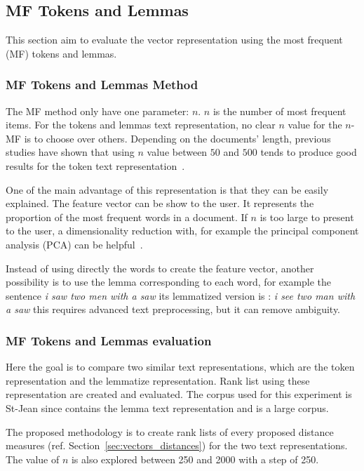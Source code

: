 \subsection{MF Tokens and Lemmas \label{sec:tokens_lemmas}}

This section aim to evaluate the vector representation using the most frequent (MF) tokens and lemmas.

\subsubsection{MF Tokens and Lemmas Method}

The MF method only have one parameter: $n$.
$n$ is the number of most frequent items.
For the tokens and lemmas text representation, no clear $n$ value for the $n$-MF is to choose over others.
Depending on the documents' length, previous studies have shown that using $n$ value between $50$ and $500$ tends to produce good results for the token text representation~\cite{savoy_text_representation}.

One of the main advantage of this representation is that they can be easily explained.
The feature vector can be show to the user.
It represents the proportion of the most frequent words in a document.
If $n$ is too large to present to the user, a dimensionality reduction with, for example the principal component analysis (PCA) can be helpful~\cite{savoy_stylo}.

Instead of using directly the words to create the feature vector, another possibility is to use the lemma corresponding to each word, for example the sentence \textit{i saw two men with a saw} its lemmatized version is : \textit{i see two man with a saw} this requires advanced text preprocessing, but it can remove ambiguity.

\subsubsection{MF Tokens and Lemmas evaluation \label{sec:tokens_lemmas_eval}}

Here the goal is to compare two similar text representations, which are the token representation and the lemmatize representation.
Rank list using these representation are created and evaluated.
The corpus used for this experiment is St-Jean since contains the lemma text representation and is a large corpus.

The proposed methodology is to create rank lists of every proposed distance measures (ref. Section~\ref{sec:vectors_distances}) for the two text representations.
The value of $n$ is also explored between 250 and 2000 with a step of 250.

